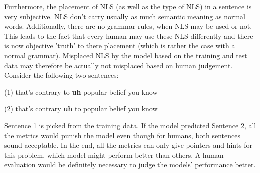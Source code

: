 \documentclass[
	11pt, %
]{fphw}
\begin{document}
Furthermore, the placement of NLS (as well as the type of NLS) in a sentence is very subjective. NLS don't carry usually as much semantic meaning as normal words. Additionally, there are no grammar rules, when NLS may be used or not. This leads to the fact that every human may use these NLS differently and there is now objective 'truth' to there placement (which is rather the case with a normal grammar). Misplaced NLS by the model based on the training and test data may therefore be actually not misplaced based on human judgement. Consider the following two sentences:
\begin{center}
    (1) that's contrary to \textbf{uh} popular belief you know
\end{center}
\begin{center}
    (2) that's contrary \textbf{uh} to popular belief you know
\end{center}
Sentence 1 is picked from the training data. If the model predicted Sentence 2, all the metrics would punish the model even though for humans, both sentences sound acceptable. In the end, all the metrics can only give pointers and hints for this problem, which model might perform better than others. A human evaluation would be definitely necessary to judge the models' performance better.
\end{document}
